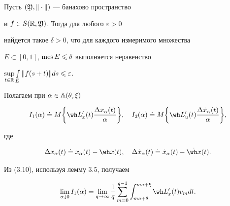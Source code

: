 \begin{lems}[{\myfont [10]}]


Пусть $(\frak Y,\|\cdot\|)$ --- банахово пространство 


и $f\in S(\Bbb R,\frak Y)$. Тогда для любого $\varepsilon>0$


найдется такое $\delta>0$, что для каждого измеримого множества


$E\subset[0,1]$, $\operatorname{mes} E\leqslant\delta$ выполняется неравенство


$\sup\limits_{t\in\Bbb


R}\int\limits_E\|f(s+t)\|ds\leqslant\varepsilon$.


\end{lems}





Полагаем при $\alpha\in\Bbb A(\theta,\xi)$


\begin{equation}


I_1(\alpha)\doteq M\bigg\{\wh L'_x(t)


\frac{{\Delta x_{\alpha}(t)}}{\alpha}\bigg\},


\quad I_2(\alpha)\doteq M\bigg\{\wh L'_u(t)\frac{\Delta \Dot


x_\alpha(t)}{\alpha}\bigg\},


\end{equation}


где


\begin{equation}


\Delta x_\alpha(t)\doteq x_\alpha(t)-\wh x(t),


\quad \Delta\Dot x_\alpha(t)\doteq\Dot x_\alpha(t)-\Dot{\wh x}(t).


\end{equation}





Из (3.10), используя лемму 3.5, получаем


\begin{equation}


\lim_{\alpha\downarrow


0}I_1(\alpha)=\lim_{q\to\infty}\frac{1}{q}\sum_{m=0}^{q-1}


\int_{ma+\theta}^{ma+\xi}\wh L'_{x}(t)v_mdt.


\end{equation}





